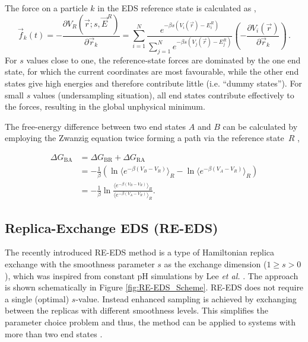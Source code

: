 The force on a particle $k$ in the EDS reference state is calculated as \cite{Christ2008},
\begin{equation}
    \vec{f}_k(t)=-\frac{\partial V_R(\vec{r}; s, \vec{E}^R)}{\partial \vec{r}_k} = \sum^N_{i=1}\frac{e^{-\beta s(V_i(\vec{r}) -E_i^R)}}{\sum^N_{j=1}{e^{-\beta s (V_j(\vec{r})-E_j^R)}}}  \left( -\frac{\partial V_i(\vec{r})}{\partial \vec{r}_k} \right) \,.
    \label{eq:laws_of_motion}
\end{equation}
%
For $s$ values close to one, the reference-state forces are dominated by the one end state, for which the current coordinates are most favourable, while the other end states give high energies and therefore contribute little (i.e. ``dummy states'').  
For small $s$ values (undersampling situation), all end states contribute effectively to the forces, resulting in the global unphysical minimum.

The free-energy difference between two end states $A$ and $B$ can be calculated by employing the Zwanzig equation twice forming a path via the reference state~$R$ \cite{Zwanzig1954,Christ2007,Christ2008},

\begin{align} \nonumber
    \Delta G_{\text{BA}} &=  \Delta G_{\text{BR}} + \Delta G_{\text{RA}} \\ 
    &=-\frac{1}{\beta}\left(\ln \langle e^{-\beta (V_B-V_R)}\rangle_R - \ln \langle e^{-\beta (V_A-V_R )}\rangle_R\right) \\ 
    &= -\frac{1}{\beta} \ln \frac{\langle e^{-\beta (V_B-V_R)}\rangle_R}{\langle e^{-\beta (V_A-V_R)}\rangle_R}.
    \label{EQ: Free Energy calculation via reference state}
 \end{align}


\subsection{Replica-Exchange EDS (RE-EDS)}
The recently introduced RE-EDS method \cite{Sidler2016,Sidler2017} is a type of Hamiltonian replica exchange \cite{Hansmann1997,Sugita2000} with the smoothness parameter $s$ as the exchange dimension ($1 \geq s > 0$), which was inspired from constant pH simulations by Lee \textit{et al.} \cite{Lee2014,Lee2015}. The approach is shown schematically in Figure \ref{fig:RE-EDS_Scheme}.
RE-EDS does not require a single (optimal) $s$-value. Instead enhanced sampling is achieved by exchanging between the replicas with different smoothness levels. This simplifies the parameter choice problem and thus, the method can be applied to systems with more than two end states \cite{Sidler2016,Sidler2017}.

